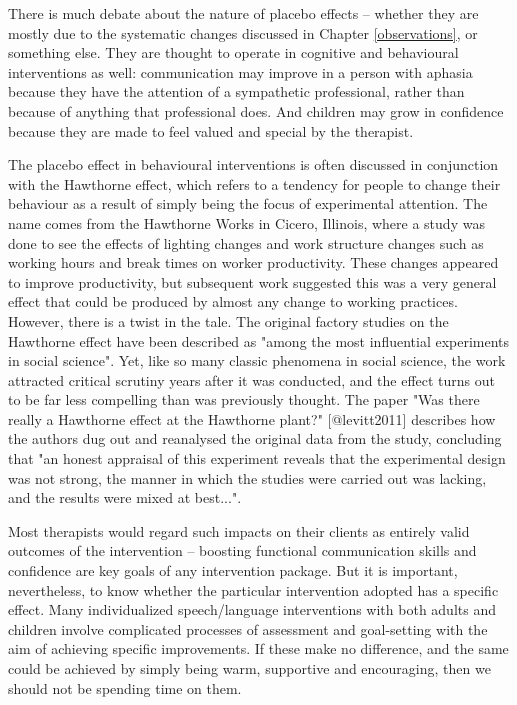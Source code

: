 \documentclass{krantz}
\begin{document}
There is much debate about the nature of placebo effects -- whether they are mostly due to the systematic changes discussed in Chapter \ref{observations}, or something else. They are thought to operate in cognitive and behavioural interventions as well: communication may improve in a person with aphasia because they have the attention of a sympathetic professional, rather than because of anything that professional does. And children may grow in confidence because they are made to feel valued and special by the therapist.

\begin{tcolorbox}[colback=Black!5!lightgray,colframe=black!75!black,coltitle=white,title=The Hawthorne Effect]\label{box:Hawthorne}
The placebo effect in behavioural interventions is often discussed in conjunction with the Hawthorne effect, which refers to a tendency for people to change their behaviour as a result of simply being the focus of experimental attention. The name comes from the Hawthorne Works in Cicero, Illinois, where a study was done to see the effects of lighting changes and work structure changes such as working hours and break times on worker productivity. These changes appeared to improve productivity, but subsequent work suggested this was a very general effect that could be produced by almost any change to working practices. However, there is a twist in the tale. The original factory studies on the Hawthorne effect have been described as "among the most influential experiments in social science". Yet, like so many classic phenomena in social science, the work attracted critical scrutiny years after it was conducted, and the effect turns out to be far less compelling than was previously thought. The paper "Was there really a Hawthorne effect at the Hawthorne plant?" [@levitt2011] describes how the authors dug out and reanalysed the original data from the study, concluding that "an honest appraisal of this experiment reveals that the experimental design was not strong, the manner in which the studies were carried out was lacking, and the results were mixed at best...".
\end{tcolorbox}

Most therapists would regard such impacts on their clients as entirely valid outcomes of the intervention -- boosting functional communication skills and confidence are key goals of any intervention package. But it is important, nevertheless, to know whether the particular intervention adopted has a specific effect. Many individualized speech/language interventions with both adults and children involve complicated processes of assessment and goal-setting with the aim of achieving specific improvements. If these make no difference, and the same could be achieved by simply being warm, supportive and encouraging, then we should not be spending time on them.
\end{document}
